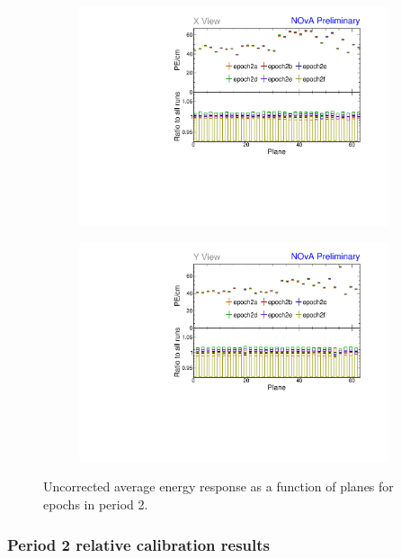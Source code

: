 \begin{figure}[h]
\centering
\begin{subfigure}[b]{0.495\textwidth}
\centering
\includegraphics[width=\textwidth]{PlotsTBCalibTechnote/Attenprofs_P2Data_PlanePE_X_Combined.pdf}
\end{subfigure}
\begin{subfigure}[b]{0.495\textwidth}
\centering
\includegraphics[width=\textwidth]{PlotsTBCalibTechnote/Attenprofs_P2Data_PlanePE_Y_Combined.pdf}
\end{subfigure}
\caption{Uncorrected average energy response as a function of planes for epochs in period 2.}
\label{fig:CalibhistPlanePE_period2}
\end{figure}

\subsubsection*{Period 2 relative calibration results}

